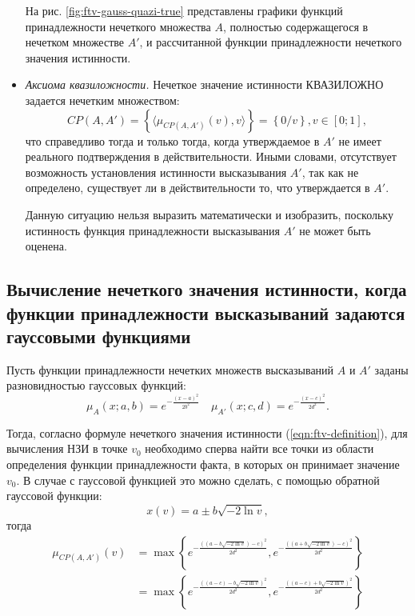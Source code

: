 \begin{itemize}
На рис. \cref{fig:ftv-gauss-quazi-true} представлены графики функций принадлежности нечеткого множества $A$, полностью содержащегося в нечетком множестве $A'$, и рассчитанной функции принадлежности нечеткого значения истинности.

\item \textit{Аксиома квазиложности.} Нечеткое значение истинности КВАЗИЛОЖНО задается нечетким множеством:
\begin{equation*} 
CP(A,A') = \left\{\langle\mu_{CP(A,A')}(v), v\rangle\right\} = \left\{0/v\right\}, v \in [0; 1],
\end{equation*}
что справедливо тогда и только тогда, когда утверждаемое в $A'$ не имеет реального подтверждения в действительности. Иными словами, отсутствует возможность установления истинности высказывания $A'$, так как не определено, существует ли в действительности то, что утверждается в $A'$.

Данную ситуацию нельзя выразить математически и изобразить, поскольку истинность функция принадлежности высказывания $A'$ не может быть оценена.
\end{itemize}

\subsection{Вычисление нечеткого значения истинности, когда функции принадлежности высказываний задаются гауссовыми функциями}

Пусть функции принадлежности нечетких множеств высказываний $A$ и $A'$ заданы разновидностью гауссовых функций:
\begin{equation*}
\mu_{A}(x; a, b) = e^{-\frac{(x-a)^2}{2b^2}} \quad \mu_{A'}(x; c, d) = e^{-\frac{(x-c)^2}{2d^2}}.
\end{equation*}

Тогда, согласно формуле нечеткого значения истинности (\ref{eqn:ftv-definition}), для вычисления НЗИ в точке $v_0$ необходимо сперва найти все точки из области определения функции принадлежности факта, в которых он принимает значение $v_0$. В случае с гауссовой функцией это можно сделать, с помощью обратной гауссовой функции:
\begin{equation*}
x(v) = a \pm b\sqrt{-2\ln{v}},
\end{equation*}
тогда
\begin{align}
\mu_{CP(A, A')}(v) &= \max\left\{e^{-\frac{((a - b\sqrt{-2\ln v})-c)^2}{2 d^2}},e^{-\frac{((a + b\sqrt{-2\ln v})-c)^2}{2 d^2}}\right\} \nonumber \\
&= \max\left\{e^{-\frac{((a-c) - b\sqrt{-2\ln v})^2}{2 d^2}},e^{-\frac{((a-c) + b\sqrt{-2\ln v})^2}{2 d^2}}\right\} \label{eqn:ftv-gauss-expanded}
\end{align}

